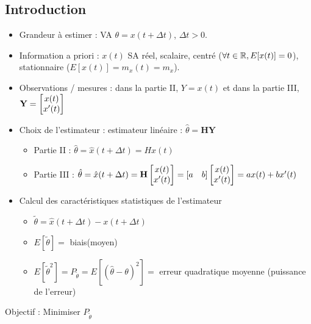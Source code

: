 \documentclass[main.tex]{subfiles}
\begin{document}
\newcommand{\hth}{\hat{\theta}}
\newcommand{\hx}{\hat{x}}
\newcommand{\bY}{\mathbf{Y}}
\newcommand{\bH}{\mathbf{H}}
\newcommand{\erth}{\tilde{\theta}}
\newcommand{\erx}{\tilde{x}}
\newcommand{\gxx}{\gamma_{xx}}

\subsection{Introduction}

\begin{itemize}
\item Grandeur à estimer : VA $\theta = x(t+\Delta t)$, $\Delta t >0$.
\item Information a priori : $x(t)$ SA réel, scalaire, centré ($\forall t \in \mathbb{R}, E[x(t)] = 0$), stationnaire ($E[x(t)] = m_x(t) = m_x$).

\item Observations / mesures :  dans la partie II, $Y=x(t)$ et dans la partie III, $\bY=\vect{ x(t) \\ x'(t) }$
\item Choix de l'estimateur : estimateur linéaire : $\hth = \bH \bY$
\begin{itemize}
\item Partie II : $\hth = \hx (t+\Delta t) = Hx(t)$
\item Partie III : $\hth = \hx (t+\Delta t) = \bH \vect{x(t) \\ x'(t) } = [a \quad b]\vect{ x(t) \\ x'(t)} =ax(t) + bx'(t)$
\end{itemize}

\item Calcul des caractéristiques statistiques de l'estimateur
\begin{itemize}
\item $ \erth = \hx(t+\Delta t) - x(t+\Delta t)$
\item $E[\erth] = $ biais(moyen)
\item $E[\erth^2] = P_{\erth} = E[(\hth-\theta)^2] =$ erreur quadratique moyenne (puissance de l'erreur)\\
\end{itemize}
\end{itemize}

Objectif : Minimiser $P_{\erth}$\\
\end{document}
